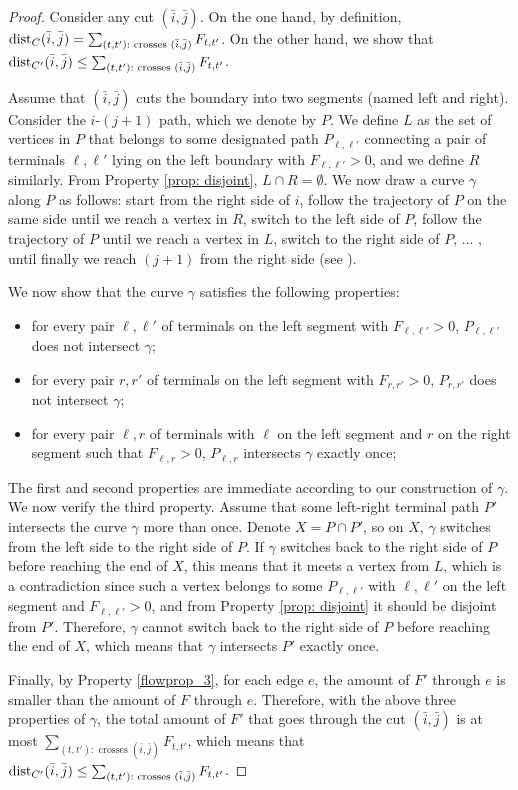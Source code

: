 \documentclass[11pt]{article}
\newcommand{\dist}{\textnormal{dist}}
\begin{document}
\begin{proof}
Consider any cut $(\bar{i},\bar{j})$. On the one hand, by definition,
$\dist_C(\bar{i},\bar{j})=\sum_{(t,t'): \text{ crosses } (\bar{i},\bar{j})} F_{t,t'}$. On the other hand, we show that
$\dist_{C'}(\bar{i},\bar{j})\le \sum_{(t,t'): \text{ crosses } (\bar{i},\bar{j})} F_{t,t'}$.

Assume that $(\bar{i},\bar {j})$ cuts the boundary into two segments (named left and right).
Consider the $i$-$(j+1)$ path, which we denote by $P$.
We define $L$ as the set of vertices in $P$ that belongs to some designated path $P_{\ell,\ell'}$ connecting a pair of terminals $\ell,\ell'$ lying on the left boundary with $F_{\ell,\ell'}>0$, and we define $R$ similarly.
From Property \ref{prop: disjoint}, $L\cap R=\emptyset$. We now draw a curve $\gamma$ along $P$ as follows: start from the right side of $i$, follow the trajectory of $P$ on the same side until we reach a vertex in $R$, switch to the left side of $P$, follow the trajectory of $P$ until we reach a vertex in $L$, switch to the right side of $P$, $\ldots$ , until finally we reach $(j+1)$ from the right side (see ).

We now show that the curve $\gamma$ satisfies the following properties:
\begin{itemize}
    \item for every pair $\ell,\ell'$ of terminals on the left segment with $F_{\ell,\ell'}>0$, $P_{\ell,\ell'}$ does not intersect $\gamma$; 
    \item for every pair $r,r'$ of terminals on the left segment with $F_{r,r'}>0$, $P_{r,r'}$ does not intersect $\gamma$; 
    \item for every pair $\ell,r$ of terminals with $\ell$ on the left segment and $r$ on the right segment such that $F_{\ell,r}>0$, $P_{\ell,r}$ intersects $\gamma$ exactly once; 
\end{itemize}

The first and second properties are immediate according to our construction of $\gamma$.
We now verify the third property.
Assume that some left-right terminal path $P'$ intersects the curve $\gamma$ more than once. Denote $X=P\cap P'$, so on $X$, $\gamma$ switches from the left side to the right side of $P$. If $\gamma$ switches back to the right side of $P$ before reaching the end of $X$, this means that it meets a vertex from $L$, which is a contradiction since such a vertex belongs to some $P_{\ell,\ell'}$ with $\ell,\ell'$ on the left segment and $F_{\ell,\ell'}>0$, and from Property \ref{prop: disjoint} it should be disjoint from $P'$. Therefore, $\gamma$ cannot switch back to the right side of $P$ before reaching the end of $X$, which means that $\gamma$ intersects $P'$ exactly once.

Finally, by Property \ref{flowprop_3}, for each edge $e$, the amount of $F'$ through $e$ is smaller than the amount of $F$ through $e$. Therefore, with the above three properties of $\gamma$, the total amount of $F'$ that goes through the cut $(\bar{i},\bar {j})$ is at most $\sum_{(t,t'): \text{ crosses } (\bar{i},\bar{j})} F_{t,t'}$, which means that $\dist_{C'}(\bar{i},\bar{j})\le \sum_{(t,t'): \text{ crosses } (\bar{i},\bar{j})} F_{t,t'}$.
\end{proof}
\end{document}
